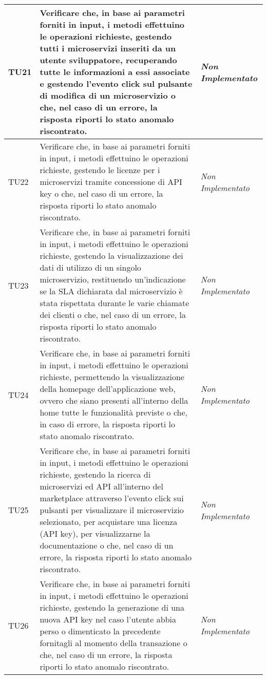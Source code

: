 \begin{longtable}{|>{\centering\arraybackslash}p{1.5cm}|>{\centering\arraybackslash}p{8cm} | >{\centering\arraybackslash}p{3.8cm}|}
		\hypertarget{TU21}{TU21} & Verificare che, in base ai parametri forniti in input, i metodi effettuino le operazioni richieste, gestendo tutti i microservizi inseriti da un utente sviluppatore, recuperando tutte le informazioni a essi associate e gestendo l'evento click sul pulsante di modifica di un microservizio o che, nel caso di un errore, la risposta riporti lo stato anomalo riscontrato. & \textit{Non Implementato}\\ \hline
		\hypertarget{TU22}{TU22} & Verificare che, in base ai parametri forniti in input, i metodi effettuino le operazioni richieste, gestendo le licenze per i microservizi tramite concessione di API key o che, nel caso di un errore, la risposta riporti lo stato anomalo riscontrato. & \textit{Non Implementato}\\ \hline
		\hypertarget{TU23}{TU23} & Verificare che, in base ai parametri forniti in input, i metodi effettuino le operazioni richieste, gestendo la visualizzazione dei dati di utilizzo di un singolo microservizio, restituendo un'indicazione se la SLA dichiarata dal microservizio è stata rispettata durante le varie chiamate dei clienti o che, nel caso di un errore, la risposta riporti lo stato anomalo riscontrato. & \textit{Non Implementato}\\ \hline
		\hypertarget{TU24}{TU24} & Verificare che, in base ai parametri forniti in input, i metodi effettuino le operazioni richieste, permettendo la visualizzazione della homepage dell'applicazione web, ovvero che siano presenti all'interno della home tutte le funzionalità previste o che, in caso di errore, la risposta riporti lo stato anomalo riscontrato. & \textit{Non Implementato}\\ \hline
		\hypertarget{TU25}{TU25} & Verificare che, in base ai parametri forniti in input, i metodi effettuino le operazioni richieste, gestendo la ricerca di microservizi ed API all'interno del marketplace attraverso l'evento click sui pulsanti per visualizzare il microservizio selezionato, per acquistare una licenza (API key), per visualizzarne la documentazione o che, nel caso di un errore, la risposta riporti lo stato anomalo riscontrato. & \textit{Non Implementato}\\ \hline
		\hypertarget{TU26}{TU26} & Verificare che, in base ai parametri forniti in input, i metodi effettuino le operazioni richieste, gestendo la generazione di una nuova API key nel caso l'utente abbia perso o dimenticato la precedente fornitagli al momento della transazione o che, nel caso di un errore, la risposta riporti lo stato anomalo riscontrato. & \textit{Non Implementato}\\ \hline

\end{longtable}
